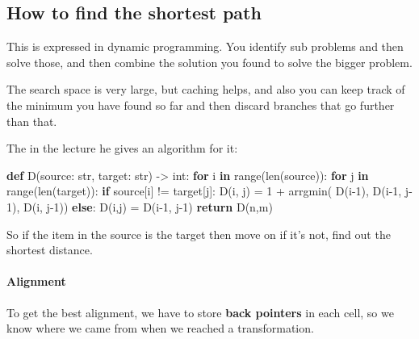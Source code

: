 \documentclass[
  11pt,
  british,
]{article}
\newenvironment{Shaded}{}{}
\newcommand{\BuiltInTok}[1]{#1}
\newcommand{\ControlFlowTok}[1]{\textcolor[rgb]{0.00,0.44,0.13}{\textbf{#1}}}
\newcommand{\DecValTok}[1]{\textcolor[rgb]{0.25,0.63,0.44}{#1}}
\newcommand{\KeywordTok}[1]{\textcolor[rgb]{0.00,0.44,0.13}{\textbf{#1}}}
\newcommand{\NormalTok}[1]{#1}
\newcommand{\OperatorTok}[1]{\textcolor[rgb]{0.40,0.40,0.40}{#1}}
\begin{document}
\hypertarget{how-to-find-the-shortest-path}{%
\subsection{How to find the shortest
path}\label{how-to-find-the-shortest-path}}

This is expressed in dynamic programming. You identify sub problems and
then solve those, and then combine the solution you found to solve the
bigger problem.

The search space is very large, but caching helps, and also you can keep
track of the minimum you have found so far and then discard branches
that go further than that.

The in the lecture he gives an algorithm for it:

\begin{Shaded}
\begin{Highlighting}[]
\KeywordTok{def}\NormalTok{ D(source: }\BuiltInTok{str}\NormalTok{, target: }\BuiltInTok{str}\NormalTok{) }\OperatorTok{{-}\textgreater{}} \BuiltInTok{int}\NormalTok{:}
    \ControlFlowTok{for}\NormalTok{ i }\KeywordTok{in} \BuiltInTok{range}\NormalTok{(}\BuiltInTok{len}\NormalTok{(source)):}
        \ControlFlowTok{for}\NormalTok{ j }\KeywordTok{in} \BuiltInTok{range}\NormalTok{(}\BuiltInTok{len}\NormalTok{(target)):}
            \ControlFlowTok{if}\NormalTok{ source[i] }\OperatorTok{!=}\NormalTok{ target[j]:}
\NormalTok{                D(i, j) }\OperatorTok{=} \DecValTok{1} \OperatorTok{+}\NormalTok{ arrgmin( D(i}\OperatorTok{{-}}\DecValTok{1}\NormalTok{), D(i}\OperatorTok{{-}}\DecValTok{1}\NormalTok{, j}\OperatorTok{{-}}\DecValTok{1}\NormalTok{), D(i, j}\OperatorTok{{-}}\DecValTok{1}\NormalTok{))}
            \ControlFlowTok{else}\NormalTok{:}
\NormalTok{                D(i,j) }\OperatorTok{=}\NormalTok{ D(i}\OperatorTok{{-}}\DecValTok{1}\NormalTok{, j}\OperatorTok{{-}}\DecValTok{1}\NormalTok{)}
    \ControlFlowTok{return}\NormalTok{ D(n,m)}
\end{Highlighting}
\end{Shaded}

So if the item in the source is the target then move on if it's not,
find out the shortest distance.

\hypertarget{alignment}{%
\paragraph{Alignment}\label{alignment}}

To get the best alignment, we have to store \textbf{back pointers} in
each cell, so we know where we came from when we reached a
transformation.
\end{document}
